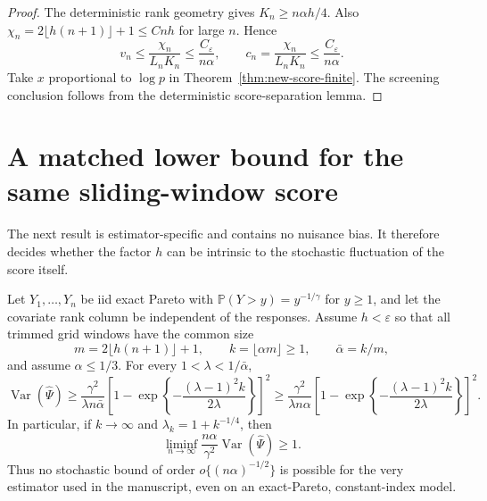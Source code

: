 \begin{proof}
The deterministic rank geometry gives
$K_n\ge n\alpha h/4$. Also
$\chi_n=2\lfloor h(n+1)\rfloor+1\le Cnh$ for large $n$. Hence
\[
 v_n\le\frac{\chi_n}{L_nK_n}
 \le\frac{C_\varepsilon}{n\alpha},
 \qquad
 c_n=\frac{\chi_n}{L_nK_n}
 \le\frac{C_\varepsilon}{n\alpha}.
\]
Take $x$ proportional to $\log p$ in
Theorem~\ref{thm:new-score-finite}. The screening conclusion follows from
the deterministic score-separation lemma.
\end{proof}

\section{A matched lower bound for the same sliding-window score}
\label{sec:new-score-lower}

The next result is estimator-specific and contains no nuisance bias. It
therefore decides whether the factor $h$ can be intrinsic to the stochastic
fluctuation of the score itself.

\begin{theorem}
\label{thm:new-score-lower}
Let $Y_1,\ldots,Y_n$ be iid exact Pareto with
$\mathbb P(Y>y)=y^{-1/\gamma}$ for $y\ge1$, and let the covariate rank
column be independent of the responses. Assume $h<\varepsilon$ so that all
trimmed grid windows have the common size
\[
 m=2\lfloor h(n+1)\rfloor+1,
 \qquad k=\lfloor\alpha m\rfloor\ge1,
 \qquad \bar\alpha=k/m,
\]
and assume $\alpha\le1/3$. For every
$1<\lambda<1/\bar\alpha$,
\[
 \operatorname{Var}(\widehat\Psi)
 \ge
 \frac{\gamma^2}{\lambda n\bar\alpha}
 \left[1-
  \exp\left\{-\frac{(\lambda-1)^2k}{2\lambda}\right\}
 \right]^2
 \ge
 \frac{\gamma^2}{\lambda n\alpha}
 \left[1-
  \exp\left\{-\frac{(\lambda-1)^2k}{2\lambda}\right\}
 \right]^2.
\]
In particular, if $k\to\infty$ and
$\lambda_k=1+k^{-1/4}$, then
\[
 \liminf_{n\to\infty}
 \frac{n\alpha}{\gamma^2}\operatorname{Var}(\widehat\Psi)\ge1.
\]
Thus no stochastic bound of order
$o\{(n\alpha)^{-1/2}\}$ is possible for the very estimator used in the
manuscript, even on an exact-Pareto, constant-index model.
\end{theorem}


